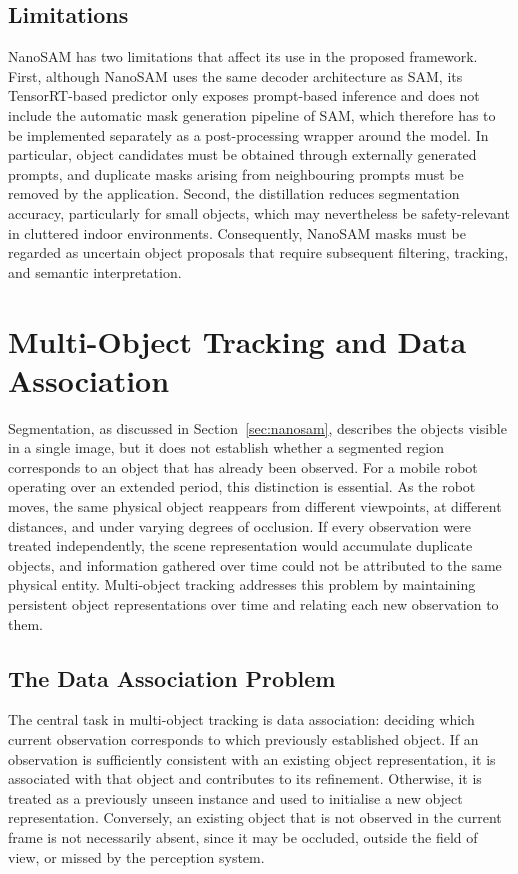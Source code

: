{{\subsection{Limitations}
\label{subsec:nanosam_limitations}
{\small
NanoSAM has two limitations that affect its use in the proposed framework. First, although NanoSAM uses the same decoder architecture as SAM, its TensorRT-based predictor only exposes prompt-based inference and does not include the automatic mask generation pipeline of SAM, which therefore has to be implemented separately as a post-processing wrapper around the model. In particular, object candidates must be obtained through externally generated prompts, and duplicate masks arising from neighbouring prompts must be removed by the application. Second, the distillation reduces segmentation accuracy, particularly for small objects, which may nevertheless be safety-relevant in cluttered indoor environments. Consequently, NanoSAM masks must be regarded as uncertain object proposals that require subsequent filtering, tracking, and semantic interpretation.
}






\section{Multi-Object Tracking and Data Association}
\label{sec:tracking_association}
{\small
Segmentation, as discussed in Section~\ref{sec:nanosam}, describes the objects visible in a single image, but it does not establish whether a segmented region corresponds to an object that has already been observed. For a mobile robot operating over an extended period, this distinction is essential. As the robot moves, the same physical object reappears from different viewpoints, at different distances, and under varying degrees of occlusion. If every observation were treated independently, the scene representation would accumulate duplicate objects, and information gathered over time could not be attributed to the same physical entity. Multi-object tracking addresses this problem by maintaining persistent object representations over time and relating each new observation to them.
}
\subsection{The Data Association Problem}
\label{subsec:data_association}
{\small
The central task in multi-object tracking is data association: deciding which current observation corresponds to which previously established object. If an observation is sufficiently consistent with an existing object representation, it is associated with that object and contributes to its refinement. Otherwise, it is treated as a previously unseen instance and used to initialise a new object representation. Conversely, an existing object that is not observed in the current frame is not necessarily absent, since it may be occluded, outside the field of view, or missed by the perception system.

}}}
